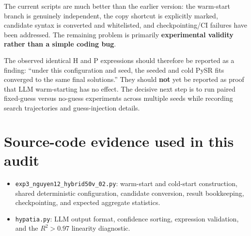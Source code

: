 \documentclass[11pt]{article}
\begin{document}
The current scripts are much better than the earlier version: the warm-start branch is genuinely independent, the copy shortcut is explicitly marked, candidate syntax is converted and whitelisted, and checkpointing/CI failures have been addressed. The remaining problem is primarily \textbf{experimental validity rather than a simple coding bug}.

The observed identical H and P expressions should therefore be reported as a finding: ``under this configuration and seed, the seeded and cold PySR fits converged to the same final solutions.'' They should \textbf{not} yet be reported as proof that LLM warm-starting has no effect. The decisive next step is to run paired fixed-guess versus no-guess experiments across multiple seeds while recording search trajectories and guess-injection details.

\section*{Source-code evidence used in this audit}

\begin{itemize}
    \item \texttt{exp3\_nguyen12\_hybrid50v\_02.py}: warm-start and cold-start construction, shared deterministic configuration, candidate conversion, result bookkeeping, checkpointing, and expected aggregate statistics.
    \item \texttt{hypatia.py}: LLM output format, confidence sorting, expression validation, and the \(R^2>0.97\) linearity diagnostic.
\end{itemize}
\end{document}
